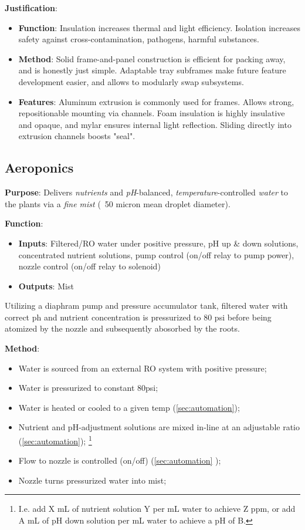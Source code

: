 \documentclass{report}
\begin{document}
\textbf{Justification}: 
\begin{itemize}
    \item \textbf{Function}: Insulation increases thermal and light efficiency. Isolation increases safety against cross-contamination, pathogens, harmful substances.
    \item \textbf{Method}: Solid frame-and-panel construction is efficient for packing away, and is honestly just simple. Adaptable tray subframes make future feature development easier, and allows to modularly swap subsystems.
    \item \textbf{Features}: Aluminum extrusion is commonly used for frames. Allows strong, repositionable mounting via channels. Foam insulation is highly insulative and opaque, and mylar ensures internal light reflection. Sliding directly into extrusion channels boosts "seal".
\end{itemize}

\newpage

\subsection{Aeroponics}
\label{sec:aeroponics}

\textbf{Purpose}: Delivers \textit{nutrients} and \textit{pH}-balanced, \textit{temperature}-controlled \textit{water} to the plants via a \textit{fine mist} (~50 micron mean droplet diameter).

\textbf{Function}:
\begin{itemize}
    \item \textbf{Inputs}: Filtered/RO water under positive pressure, pH up \& down solutions, concentrated nutrient solutions, pump control (on/off relay to pump power), nozzle control (on/off relay to solenoid)
    \item \textbf{Outputs}: Mist
\end{itemize}

Utilizing a diaphram pump and pressure accumulator tank, filtered water with correct ph and nutrient concentration is pressurized to 80 psi before being atomized by the nozzle and subsequently abosorbed by the roots.

\textbf{Method}:
\begin{itemize} 
    \item Water is sourced from an external RO system with positive pressure;
    \item Water is pressurized to constant 80psi;
    \item Water is heated or cooled to a given temp (\ref{sec:automation}); %
    \item Nutrient and pH-adjustment solutions are mixed in-line at an adjustable ratio (\ref{sec:automation}); \footnote{I.e. add X mL of nutrient solution Y per mL water to achieve Z ppm, or add A mL of pH down solution per mL water to achieve a pH of B.}
    \item Flow to nozzle is controlled (on/off) (\ref{sec:automation}
    );
    \item Nozzle turns pressurized water into mist;
\end{itemize}
\end{document}
